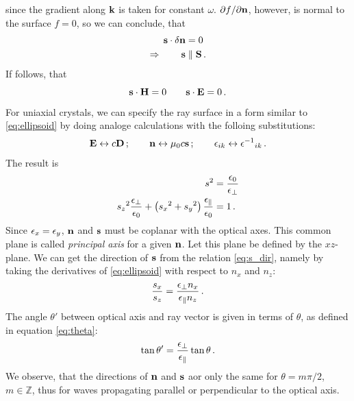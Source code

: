 since the gradient along $\mathbf{k}$ is taken for constant $\omega$. $\partial f / \partial \mathbf{n}$, however, 
is normal to the surface $f = 0$, so we can conclude, that
\begin{align}
    \mathbf{s} \cdot \delta \mathbf{n} &= 0 \\
    \Rightarrow \qquad \mathbf{s} &\parallel \mathbf{S} \, .
\end{align}
If follows, that 
\begin{equation}
    \mathbf{s} \cdot \mathbf{H} = 0 \qquad \mathbf{s} \cdot \mathbf{E} = 0 \, .
    \label{eq:coplanar}
\end{equation}
For uniaxial crystals, we can specify the ray surface in a form similar to 
\eqref{eq:ellipsoid} by doing analoge calculations with the folloing substitutions:
\begin{equation}
    \mathbf{E} \leftrightarrow c \mathbf{D} \, ; 
    \qquad \mathbf{n} \leftrightarrow \mu_0 c \mathbf{s} \, ; 
    \qquad \epsilon_{ik} \leftrightarrow {\epsilon^{-1}}_{ik} \, .
\end{equation}
The result is 
\begin{align}
    s^2 &= \frac{\epsilon_0}{\epsilon_\perp}
    \label{eq:s_sphere} \\
    {s_z}^2 \frac{\epsilon_\perp}{\epsilon_0} + \left( {s_x}^2 + 
        {s_y}^2\right) \frac{\epsilon_\parallel}{\epsilon_0} &= 1 \, .
    \label{eq:s_ellipsoid}
\end{align}
Since $\epsilon_x = \epsilon_y$, $\mathbf{n}$ and $\mathbf{s}$ must be coplanar with the optical axes. This 
common plane is called \emph{principal axis} for a given $\mathbf{n}$. Let this plane be 
defined by the $xz$-plane. We can get the direction 
of $\mathbf{s}$ from the relation \eqref{eq:s_dir}, namely by taking the derivatives of 
\eqref{eq:ellipsoid} with respect to $n_x$ and $n_z$:
\begin{equation}
    \frac{s_x}{s_z} = \frac{\epsilon_\perp n_x}{\epsilon_\parallel n_z} \, .
\end{equation}
The angle $\theta'$ between optical axis and ray vector is given in terms of 
$\theta$, as defined in equation \eqref{eq:theta}:
\begin{equation}
    \tan \theta' = \frac{\epsilon_\perp}{\epsilon_\parallel} \tan \theta\, .
\end{equation}
We observe, that the directions of $\mathbf{n}$ and $\mathbf{s}$ aor only the same for 
$\theta = m \pi / 2$, $m \in \mathbb{Z}$, 
thus for waves propagating parallel or perpendicular to the optical axis. 


